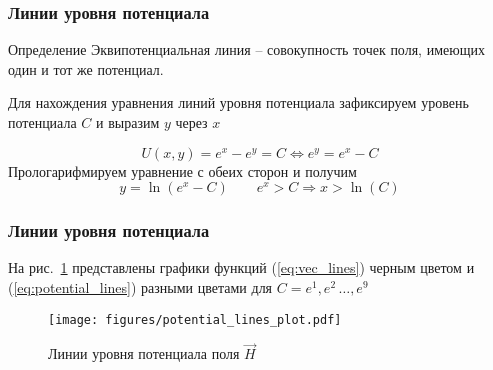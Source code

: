 \begin{frame}\frametitle{Линии уровня потенциала}
	\begin{block}{Определение}
		Эквипотенциальная линия -- совокупность точек поля, имеющих один и тот же
		потенциал.
	\end{block}

	Для нахождения уравнения линий уровня потенциала зафиксируем
	уровень потенциала \(C\) и выразим \(y\) через \(x\)

	\begin{equation*}
		U(x, y) = e^x - e^y = C \Longleftrightarrow e^y = e^x - C
	\end{equation*}
	Прологарифмируем уравнение с обеих сторон и получим
	\begin{equation}
		y = \ln(e^x - C) \qquad e^x > C \Rightarrow x > \ln(C)
		\label{eq:potential_lines}
	\end{equation}

\end{frame}

\begin{frame}\frametitle{Линии уровня потенциала}
  На рис.~\ref{fig:potential_lines} представлены графики функций
  (\ref{eq:vec_lines}) черным цветом и (\ref{eq:potential_lines})
  разными цветами для $C = e^1, e^2\, \ldots, e^9$
	\begin{figure}
		\centering
		\texttt{[image: figures/potential\_lines\_plot.pdf]}
    \caption{Линии уровня потенциала поля \(\vec H\)}\label{fig:potential_lines}
	\end{figure}

\end{frame}
